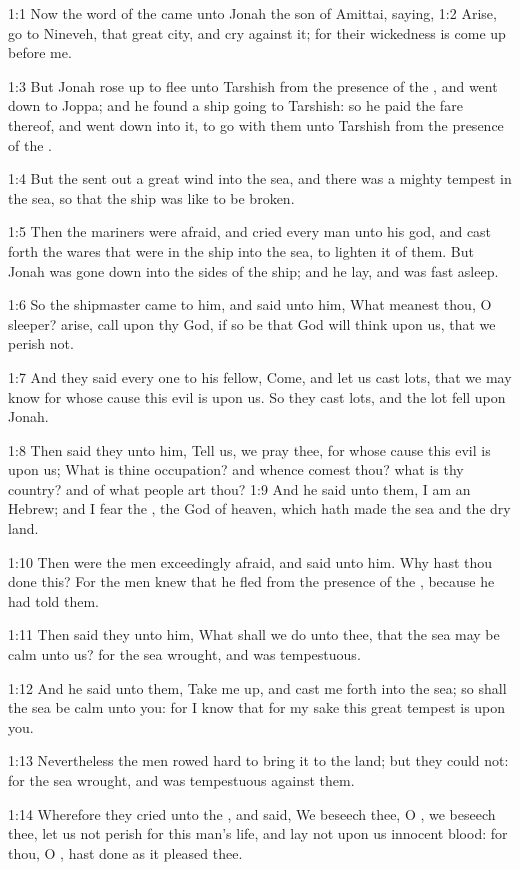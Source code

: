 

1:1 Now the word of the \LORD came unto Jonah the son of Amittai, saying, 1:2 Arise, go to Nineveh, that great city, and cry against it; for their wickedness is come up before me.

1:3 But Jonah rose up to flee unto Tarshish from the presence of the \LORD, and went down to Joppa; and he found a ship going to Tarshish: so he paid the fare thereof, and went down into it, to go with them unto Tarshish from the presence of the \LORD.

1:4 But the \LORD sent out a great wind into the sea, and there was a mighty tempest in the sea, so that the ship was like to be broken.

1:5 Then the mariners were afraid, and cried every man unto his god, and cast forth the wares that were in the ship into the sea, to lighten it of them. But Jonah was gone down into the sides of the ship; and he lay, and was fast asleep.

1:6 So the shipmaster came to him, and said unto him, What meanest thou, O sleeper? arise, call upon thy God, if so be that God will think upon us, that we perish not.

1:7 And they said every one to his fellow, Come, and let us cast lots, that we may know for whose cause this evil is upon us. So they cast lots, and the lot fell upon Jonah.

1:8 Then said they unto him, Tell us, we pray thee, for whose cause this evil is upon us; What is thine occupation? and whence comest thou? what is thy country? and of what people art thou?  1:9 And he said unto them, I am an Hebrew; and I fear the \LORD, the God of heaven, which hath made the sea and the dry land.

1:10 Then were the men exceedingly afraid, and said unto him. Why hast thou done this? For the men knew that he fled from the presence of the \LORD, because he had told them.

1:11 Then said they unto him, What shall we do unto thee, that the sea may be calm unto us? for the sea wrought, and was tempestuous.

1:12 And he said unto them, Take me up, and cast me forth into the sea; so shall the sea be calm unto you: for I know that for my sake this great tempest is upon you.

1:13 Nevertheless the men rowed hard to bring it to the land; but they could not: for the sea wrought, and was tempestuous against them.

1:14 Wherefore they cried unto the \LORD, and said, We beseech thee, O \LORD, we beseech thee, let us not perish for this man's life, and lay not upon us innocent blood: for thou, O \LORD, hast done as it pleased thee.

